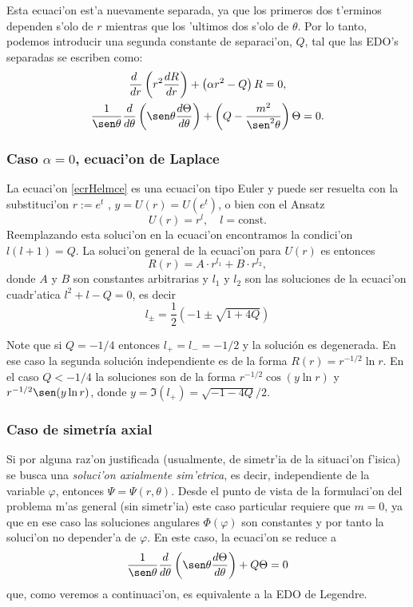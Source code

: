 Esta ecuaci'on est'a nuevamente separada, ya que los primeros dos t'erminos dependen s'olo de $r$ mientras que los 'ultimos dos s'olo de $\theta$. Por lo tanto, podemos introducir una segunda constante de separaci'on, $Q$, tal que las EDO's separadas se escriben como:
\begin{gather}
\frac{d\ }{dr}\left(r^2\frac{dR}{dr}\right)+\left(\alpha r^2-Q\right)R=0, \label{ecrHelmce}\\
\frac{1}{\sen\theta}\frac{d}{d\theta}\left(\sen\theta\frac{d\Theta}{d\theta}\right)
+\left(Q-\frac{m^2}{\sen^2\theta}\right) \Theta = 0. \label{ecThHelm}
\end{gather}

\subsubsection{Caso $\alpha=0$, ecuaci'on de Laplace}
 La ecuaci'on \eqref{ecrHelmce} es una ecuaci'on tipo Euler y puede ser resuelta con la
substituci'on $r:=e^t$ , $y=U(r)=U(e^t)$, o bien con el Ansatz
 \begin{equation}
  U(r) = r^l,\quad l=\text{const.}
\end{equation}
  Reemplazando esta soluci'on en la ecuaci'on encontramos la condici'on
 $l(l+1)=Q$. La soluci'on general de la ecuaci'on para $U(r)$ es entonces
\begin{equation}
 R(r) = A\cdot r^{l_1} + B\cdot r^{l_2},\label{loes2}
\end{equation}
donde $A$ y $B$ son constantes arbitrarias y $l_1$ y $l_2$ son las soluciones de la ecuaci'on cuadr'atica $l^2+l-Q=0$, es decir
\begin{equation}
l_\pm = \frac{1}{2}\left(-1\pm\sqrt{1+4Q}\right)
\end{equation}

Note que si $Q=-1/4$ entonces $l_+=l_-=-1/2$ y la solución es degenerada. En ese caso la segunda solución independiente es de la forma $R(r) = r^{-1/2}\ln r$. En el caso $Q<-1/4$ la soluciones son de la forma $r^{-1/2}\cos(y\ln r)$ y $r^{-1/2}\sen(y\ln r)$, donde $y=\Im(l_+)=\sqrt{-1-4Q}/2$.


\subsubsection{Caso de simetr\'ia axial}
Si por alguna raz'on justificada (usualmente, de simetr'ia de la situaci'on f'isica) se busca una \textit{soluci'on axialmente sim'etrica}, es decir, independiente de la variable $\varphi$, entonces $\Psi=\Psi(r,\theta)$. Desde el punto de vista de la formulaci'on del problema m'as general (sin simetr'ia) este caso particular requiere que $m=0$, ya que en ese caso las soluciones angulares $\Phi(\varphi)$ son constantes y por tanto la soluci'on no depender'a de $\varphi$. En este caso, la ecuaci'on se reduce a
\begin{equation}
\frac{1}{\sen\theta}\frac{d}{d\theta}\left(\sen\theta\frac{d\Theta}{d\theta}\right)
+Q\Theta = 0
\end{equation}
que, como veremos a continuaci'on, es equivalente a la EDO de Legendre.